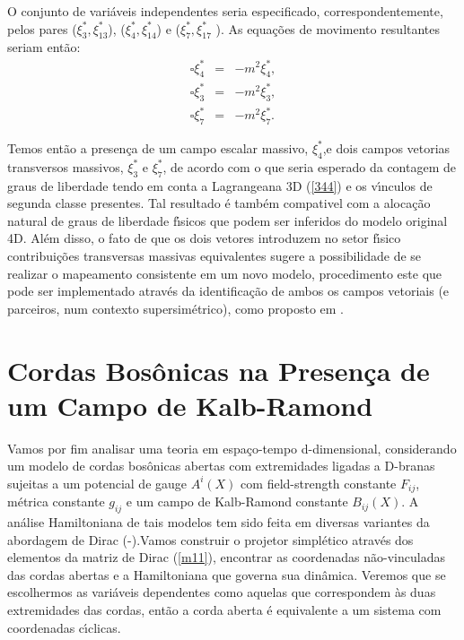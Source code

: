 \documentclass[a4paper,thmsa,12pt]{report}
\begin{document}
O conjunto de vari\'{a}veis independentes seria especificado,
correspondentemente, pelos pares ($\xi _{3}^{\ast },\xi _{13}^{\ast }$), ($%
\xi _{4}^{\ast },\xi _{14}^{\ast }$) e ($\xi _{7}^{\ast },\xi _{17}^{\ast }$%
). As equa\c{c}\~{o}es de movimento resultantes seriam ent\~{a}o: 
\begin{eqnarray}
\square \xi _{4}^{\ast } &=&-m^{2}\xi _{4}^{\ast },  \nonumber \\
\square \xi _{3}^{\ast } &=&-m^{2}\xi _{3}^{\ast },  \nonumber \\
\square \xi _{7}^{\ast } &=&-m^{2}\xi _{7}^{\ast }.  \label{368}
\end{eqnarray}

Temos ent\~{a}o a presen\c{c}a de um campo escalar massivo, $\xi _{4}^{\ast }
$,e dois campos vetorias transversos massivos, $\xi _{3}^{\ast }$ e $\xi
_{7}^{\ast }$, de acordo com o que seria esperado da contagem de graus de
liberdade tendo em conta a Lagrangeana 3D (\ref{344}) e os v\'{\i}nculos de
segunda classe presentes. Tal resultado \'{e} tamb\'{e}m compativel com a
aloca\c{c}\~{a}o natural de graus de liberdade f\'{\i}sicos que podem ser
inferidos do modelo original 4D. Al\'{e}m disso, o fato de que os dois
vetores introduzem no setor f\'{\i}sico contribui\c{c}\~{o}es transversas
massivas equivalentes sugere a possibilidade de se realizar o mapeamento consistente em um
novo modelo, procedimento este que pode ser implementado atrav\'{e}s da
identifica\c{c}\~{a}o de ambos os campos vetoriais (e parceiros, num contexto
supersim\'{e}trico), como proposto em \cite{cchmn1}.

\chapter{{\sc Cordas Bos\^{o}nicas na Presen\c{c}a de um Campo de
Kalb-Ramond}}

Vamos por fim analisar uma teoria em espa\c{c}o-tempo d-dimensional,
considerando um modelo de cordas bos\^{o}nicas abertas com extremidades
ligadas a D-branas sujeitas a um potencial de gauge $A^{i}\left( X\right) $
com field-strength constante $F_{ij}$, m\'{e}trica constante $g_{ij}$ e um
campo de Kalb-Ramond constante $B_{ij}\left( X\right) .$ A an\'{a}lise
Hamiltoniana de tais modelos tem sido feita em diversas variantes da
abordagem de Dirac (\cite{witten}-\cite{rudy}).Vamos construir o projetor
simpl\'{e}tico atrav\'{e}s dos elementos da matriz de Dirac (\ref{m11}),
encontrar as coordenadas n\~{a}o-vinculadas das cordas abertas e a
Hamiltoniana que governa sua din\^{a}mica. Veremos que se escolhermos as
vari\'{a}veis dependentes como aquelas que correspondem \`{a}s duas
extremidades das cordas, ent\~{a}o a corda aberta \'{e} equivalente a um
sistema com coordenadas c\'{\i}clicas\cite{mmi}.
\end{document}
